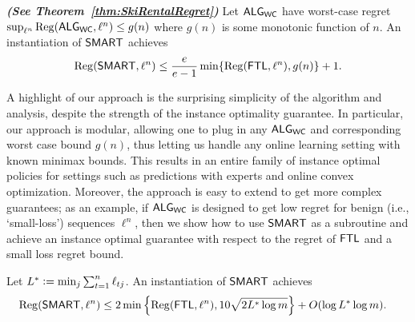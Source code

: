 \begin{thm}{\emph{\bf (See Theorem~\ref{thm:SkiRentalRegret})}}
      Let $\mathsf{ALG}_{\mathsf{WC}}$ have worst-case regret $\sup_{\ell^n} \mathrm{Reg}(\mathsf{ALG}_{\mathsf{WC}}, \ell^n) \le g(n)$
      where $g(n)$ is some monotonic function of $n$. An instantiation of $\mathsf{SMART}$ achieves  
    \begin{align} \label{eq:2ApproxReg}
\small        \mathrm{Reg}(\mathsf{SMART}, \ell^n) \le \frac{e}{e-1} \min\{\mathrm{Reg}(\mathsf{FTL},\ell^n),g(n)\} + 1.
    \end{align}
\end{thm}
A highlight of our approach is the surprising simplicity of the algorithm and analysis, despite the strength of the instance optimality guarantee. In particular, our approach is modular, allowing one to plug in any $\mathsf{ALG}_{\mathsf{WC}}$ and corresponding worst case bound $g(n)$, thus letting us handle any online learning setting with known minimax bounds. This results in an entire family of instance optimal policies for settings such as predictions with experts and online convex optimization. Moreover, the approach is easy to extend to get more complex guarantees; as an example, if $\mathsf{ALG}_{\mathsf{WC}}$ is designed to get low regret for benign (i.e., `small-loss') sequences $\ell^n$, then we show how to use $\mathsf{SMART}$ as a subroutine and achieve an instance optimal guarantee with respect to the regret of $\mathsf{FTL}$ and a small loss regret bound. 
\begin{corollary}
\label{cor:SqrtLStarInstantiation}
    Let $L^* \mathrel{\mathop{:}}= \min_j \sum_{t=1}^n \ell_{tj}$. An instantiation of $\mathsf{SMART}$ achieves
    \begin{align*}
        \mathrm{Reg}(\mathsf{SMART}, \ell^n) 
        &\le 2 \min\left\{ \mathrm{Reg}(\mathsf{FTL},\ell^n), 10 \sqrt{2L^* \log m} \right\} + O(\log L^* \log m).
    \end{align*}
\end{corollary}

